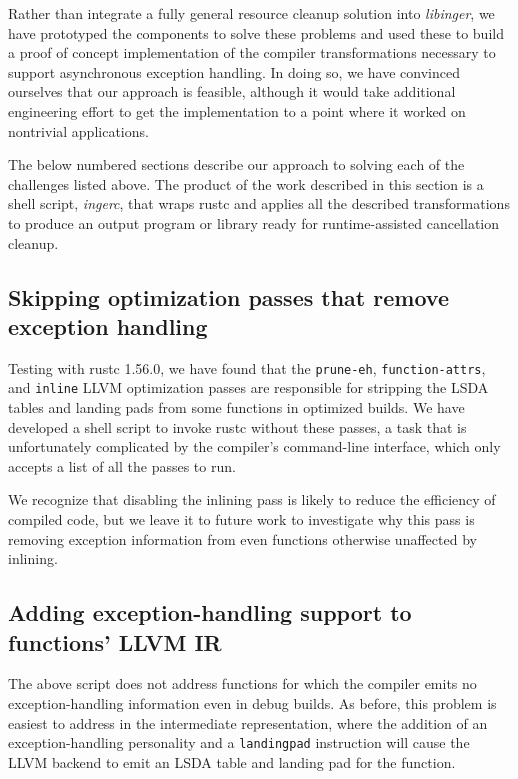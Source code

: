 Rather than integrate a fully general resource cleanup solution into
\textit{libinger}, we have prototyped the components to solve these problems and used
these to build a proof of concept implementation of the compiler transformations
necessary to support asynchronous exception handling.  In doing so, we have convinced
ourselves that our approach is feasible, although it would take additional
engineering effort to get the implementation to a point where it worked on nontrivial
applications.

The below numbered sections describe our approach to solving each of the
challenges listed above.  The product of the work described in this section is a
shell script, \textit{ingerc}, that wraps rustc and applies all the described
transformations to produce an output program or library ready for runtime-assisted
cancellation cleanup.


\subsection{Skipping optimization passes that remove exception handling}

Testing with rustc 1.56.0, we have found that the \texttt{prune-eh},
\texttt{function-attrs}, and \texttt{inline} LLVM optimization passes are
responsible for stripping the LSDA tables and landing pads from some functions in
optimized builds.  We have developed a shell script to invoke rustc without these
passes, a task that is unfortunately complicated by the compiler's command-line
interface, which only accepts a list of all the passes to run.

We recognize that disabling the inlining pass is likely to reduce the efficiency of
compiled code, but we leave it to future work to investigate why this pass is
removing exception information from even functions otherwise unaffected by inlining.


\subsection{Adding exception-handling support to functions' LLVM IR}
\label{sec:ingerc:optimization}

The above script does not address functions for which the compiler emits no
exception-handling information even in debug builds.  As before, this problem is
easiest to address in the intermediate representation, where the addition of an
exception-handling personality and a \texttt{landingpad} instruction will cause the
LLVM backend to emit an LSDA table and landing pad for the function.

